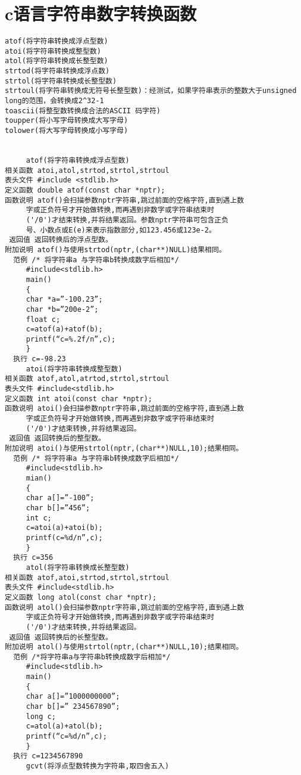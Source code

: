 \section{c语言字符串数字转换函数}
\begin{verbatim}
atof(将字符串转换成浮点型数)
atoi(将字符串转换成整型数)
atol(将字符串转换成长整型数)
strtod(将字符串转换成浮点数)
strtol(将字符串转换成长整型数)
strtoul(将字符串转换成无符号长整型数)：经测试，如果字符串表示的整数大于unsigned long的范围，会转换成2^32-1
toascii(将整型数转换成合法的ASCII 码字符)
toupper(将小写字母转换成大写字母)
tolower(将大写字母转换成小写字母)


     atof(将字符串转换成浮点型数)
相关函数 atoi,atol,strtod,strtol,strtoul
表头文件 #include <stdlib.h>
定义函数 double atof(const char *nptr);
函数说明 atof()会扫描参数nptr字符串,跳过前面的空格字符,直到遇上数
     字或正负符号才开始做转换,而再遇到非数字或字符串结束时
     ('/0')才结束转换,并将结果返回。参数nptr字符串可包含正负
     号、小数点或E(e)来表示指数部分,如123.456或123e-2。
 返回值 返回转换后的浮点型数。
附加说明 atof()与使用strtod(nptr,(char**)NULL)结果相同。
  范例 /* 将字符串a 与字符串b转换成数字后相加*/
     #include<stdlib.h>
     main()
     {
     char *a=”-100.23”;
     char *b=”200e-2”;
     float c;
     c=atof(a)+atof(b);
     printf(“c=%.2f/n”,c);
     }
  执行 c=-98.23
     atoi(将字符串转换成整型数)
相关函数 atof,atol,atrtod,strtol,strtoul
表头文件 #include<stdlib.h>
定义函数 int atoi(const char *nptr);
函数说明 atoi()会扫描参数nptr字符串,跳过前面的空格字符,直到遇上数
     字或正负符号才开始做转换,而再遇到非数字或字符串结束时
     ('/0')才结束转换,并将结果返回。
 返回值 返回转换后的整型数。
附加说明 atoi()与使用strtol(nptr,(char**)NULL,10);结果相同。
  范例 /* 将字符串a 与字符串b转换成数字后相加*/
     #include<stdlib.h>
     mian()
     {
     char a[]=”-100”;
     char b[]=”456”;
     int c;
     c=atoi(a)+atoi(b);
     printf(c=%d/n”,c);
     }
  执行 c=356
     atol(将字符串转换成长整型数)
相关函数 atof,atoi,strtod,strtol,strtoul
表头文件 #include<stdlib.h>
定义函数 long atol(const char *nptr);
函数说明 atol()会扫描参数nptr字符串,跳过前面的空格字符,直到遇上数
     字或正负符号才开始做转换,而再遇到非数字或字符串结束时
     ('/0')才结束转换,并将结果返回。
 返回值 返回转换后的长整型数。
附加说明 atol()与使用strtol(nptr,(char**)NULL,10);结果相同。
  范例 /*将字符串a与字符串b转换成数字后相加*/
     #include<stdlib.h>
     main()
     {
     char a[]=”1000000000”;
     char b[]=” 234567890”;
     long c;
     c=atol(a)+atol(b);
     printf(“c=%d/n”,c);
     }
  执行 c=1234567890
     gcvt(将浮点型数转换为字符串,取四舍五入)

\end{verbatim}
